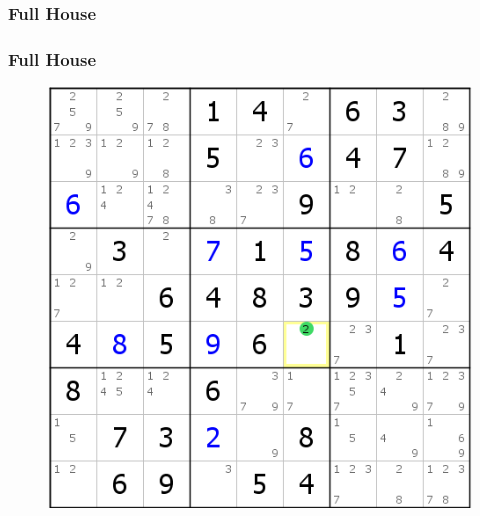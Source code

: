\documentclass[accentcolor=tud6b,colorbacktitle,inverttitle,landscape,german,presentation,t]{tudbeamer}
\begin{document}
		\subsubsection{Full House}
			\begin{frame}
			\frametitle{Full House}
			\begin{figure}[Hh]
    			\includegraphics[width=\textwidth,height=\textheight-10pt,keepaspectratio]{./img/full_house.png}
			\end{figure}
			\end{frame}
\end{document}
